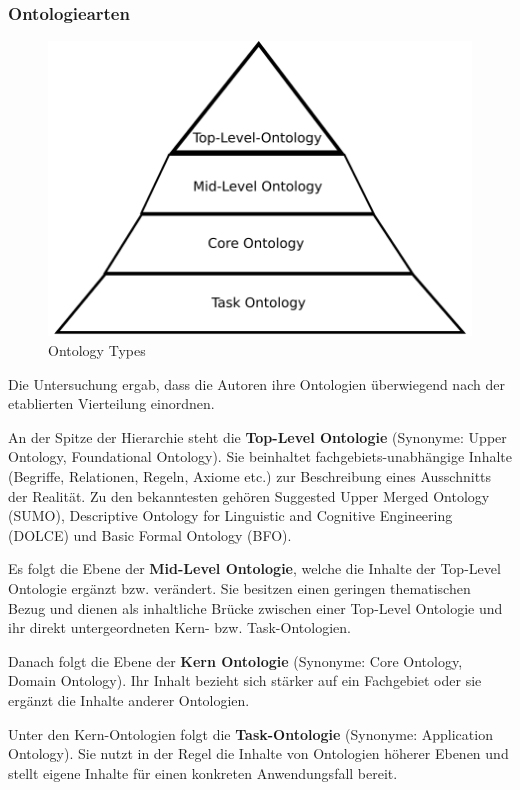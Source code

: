 \documentclass{article}
\begin{document}
\subsubsection{Ontologiearten}

\begin{figure}[H]
    \includegraphics[scale=0.4]{ontology-types}
    \centering
    \caption{Ontology Types}
\end{figure}

Die Untersuchung ergab, dass die Autoren ihre Ontologien überwiegend nach der etablierten Vierteilung einordnen.

An der Spitze der Hierarchie steht die \textbf{Top-Level Ontologie} (Synonyme: Upper Ontology, Foundational Ontology).
Sie beinhaltet fachgebiets-unabhängige Inhalte (Begriffe, Relationen, Regeln, Axiome etc.) zur Beschreibung eines Ausschnitts der Realität.
Zu den bekanntesten gehören Suggested Upper Merged Ontology (SUMO), Descriptive Ontology for Linguistic and Cognitive Engineering (DOLCE) und Basic Formal Ontology (BFO).

Es folgt die Ebene der \textbf{Mid-Level Ontologie}, welche die Inhalte der Top-Level Ontologie ergänzt bzw. verändert. Sie besitzen einen geringen thematischen Bezug und dienen als inhaltliche Brücke zwischen einer Top-Level Ontologie und ihr direkt untergeordneten Kern- bzw. Task-Ontologien.

Danach folgt die Ebene der \textbf{Kern Ontologie} (Synonyme: Core Ontology, Domain Ontology).
Ihr Inhalt bezieht sich stärker auf ein Fachgebiet oder sie ergänzt die Inhalte anderer Ontologien.

Unter den Kern-Ontologien folgt die \textbf{Task-Ontologie} (Synonyme: Application Ontology).
Sie nutzt in der Regel die Inhalte von Ontologien höherer Ebenen und stellt eigene Inhalte für einen konkreten Anwendungsfall bereit.
\end{document}
